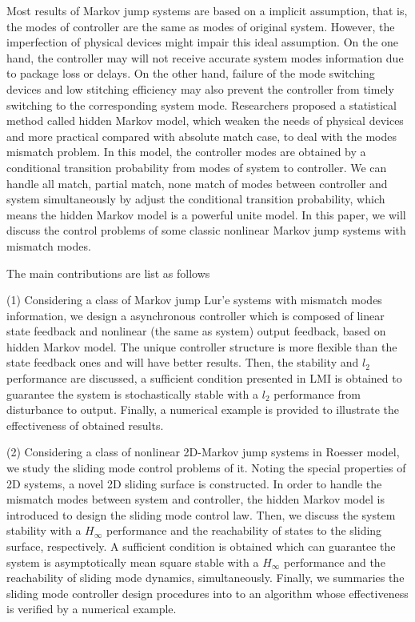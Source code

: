 

\begin{eabstract}
Most results of Markov jump systems are based on a implicit assumption, that is, the modes of controller are the same as modes of original system. However, the imperfection of  physical devices might impair this ideal assumption. On the one hand, the controller may will not receive accurate system modes information due to package loss or delays. On the other hand, failure of the mode switching devices and low stitching efficiency may also prevent the controller from  timely switching to the corresponding system mode. Researchers proposed a  statistical method called hidden Markov model, which weaken the needs of physical devices and more practical compared with absolute match case, to deal with the modes mismatch problem. In this model, the controller modes are obtained by a conditional transition probability from modes of system to controller. We can handle all match, partial match, none match of modes between controller and system simultaneously by adjust the conditional transition probability, which means the hidden Markov model is a powerful unite model. In this paper, we will discuss the control problems of some classic nonlinear Markov jump systems with mismatch modes.

The main contributions are list as follows

(1) Considering a class of Markov jump Lur'e systems with mismatch modes information,  we design a asynchronous controller which is composed of  linear state feedback and  nonlinear (the same as system) output feedback, based on hidden Markov model.  The unique controller structure is more flexible  than the  state feedback ones and will have better results. Then, the stability and $l_2$ performance are discussed, a sufficient condition presented in LMI is obtained to guarantee the system is stochastically stable with a $l_2$ performance from disturbance to output. Finally, a numerical example is provided to illustrate the effectiveness of obtained results.

(2) Considering a class of nonlinear 2D-Markov jump systems in Roesser model, we study the sliding mode control problems of it. Noting the special properties of 2D systems, a novel 2D sliding surface is constructed. In order to handle the mismatch modes between system and controller, the hidden Markov model is introduced to design the sliding mode control law. Then, we discuss the system stability with a  $H_\infty$ performance and the reachability of states to the sliding surface, respectively. A sufficient condition is obtained which can guarantee the system is  asymptotically mean square stable with a $H_\infty$  performance and the reachability of sliding mode dynamics, simultaneously. Finally, we summaries  the sliding mode controller design procedures into to an algorithm whose effectiveness is verified by a numerical example. 



\end{eabstract}
